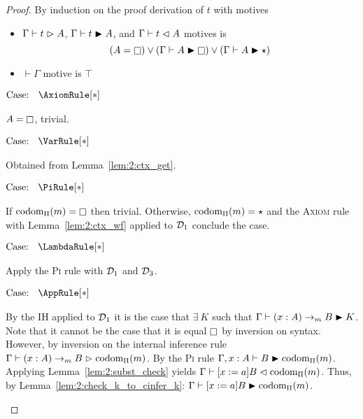 \begin{proof}
    By induction on the proof derivation of $t$ with motives
    \begin{itemize}
        \item {
            $\Gamma \vdash t \vartriangleright A$, $\Gamma \vdash t \blacktriangleright A$, and $\Gamma \vdash t \vartriangleleft A$ motives is
            $$(A = \kind) \vee (\Gamma \vdash A \cinfr \kind) \vee (\Gamma \vdash A \cinfr \star)$$
        }
        \item {
            $\vdash \Gamma$ motive is $\top$
        }
    \end{itemize}

    $\text{Case: }\begin{array}{c} \AxiomRule[*] \end{array}$
    \begin{proofcase}
        $A = \kind$, trivial.
    \end{proofcase}

    $\text{Case: }\begin{array}{c} \VarRule[*] \end{array}$
    \begin{proofcase}
        Obtained from Lemma~\ref{lem:2:ctx_get}.
    \end{proofcase}

    $\text{Case: }\begin{array}{c} \PiRule[*] \end{array}$
    \begin{proofcase}
        If $\pcodom(m) = \kind$ then trivial.
        Otherwise, $\mbox{\normalfont codom}_\Pi(m) = \star$ and the \textsc{Axiom} rule with Lemma~\ref{lem:2:ctx_wf} applied to $\mathcal{D}_{1}$ conclude the case.
    \end{proofcase}

    $\text{Case: }\begin{array}{c} \LambdaRule[*] \end{array}$
    \begin{proofcase}
        Apply the \textsc{Pi} rule with $\mathcal{D}_{1}$ and $\mathcal{D}_{3}$.
    \end{proofcase}

    $\text{Case: }\begin{array}{c} \AppRule[*] \end{array}$
    \begin{proofcase}
        By the IH applied to $\mathcal{D}_{1}$ it is the case that $\exists\ K$ such that $\Gamma \vdash (x : A) \to_m B \blacktriangleright K$.
        Note that it cannot be the case that it is equal $\kind$ by inversion on syntax.
        However, by inversion on the internal inference rule $\Gamma \vdash (x : A) \to_m B \vartriangleright \mbox{\normalfont codom}_\Pi(m)$.
        By the \textsc{Pi} rule $\Gamma, x : A \vdash B \blacktriangleright \mbox{\normalfont codom}_\Pi(m)$.
        Applying Lemma~\ref{lem:2:subst_check} yields $\Gamma \vdash [x := a]B \vartriangleleft \mbox{\normalfont codom}_\Pi(m)$.
        Thus, by Lemma~\ref{lem:2:check_k_to_cinfer_k}: $\Gamma \vdash [x := a]B \blacktriangleright \mbox{\normalfont codom}_\Pi(m)$.
    \end{proofcase}


\end{proof}
